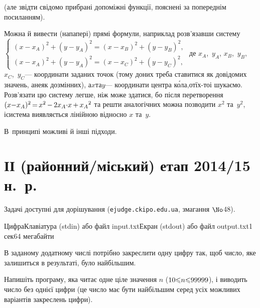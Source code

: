 \documentclass[14pt,a4paper]{extarticle}
\def\dib#1{\,#1\discretionary{}{\mbox{$#1$}}{}\,}
\begin{document}
 (але звідти свідомо прибрані допоміжні функції, пояснені за попереднім посиланням).

Можна й вивести (на\nolinebreak[3] папері) прямі формули, наприклад розв'язавши систему
$\left\{
\begin{array}{c}
(x{-}x_A)^2+(y{-}y_A)^2 = (x{-}x_B)^2+(y{-}y_B)^2,\\
(x{-}x_A)^2+(y{-}y_A)^2 = (x{-}x_C)^2+(y{-}y_C)^2,
\end{array}
\right.$
де $x_A$,~$y_A$, $x_B$,~$y_B$, $x_C$,~$y_C$\nolinebreak[3] --- координати заданих точок (тому до\nolinebreak[3] них треба ставитися як до\nolinebreak[3] відомих значень, а\nolinebreak[3] не\nolinebreak[3] як до\nolinebreak[3] змінних), а\nolinebreak[3] $x$\nolinebreak[1] та\nolinebreak[3] $y$\nolinebreak[3] --- координати центра к\'{о}ла,\linebreak[1] от\nolinebreak[1] їх-то\nolinebreak[1] і шукаємо. Розв'язати цю систему легше, ніж може здатися, бо після перетворення ${(x{-}x_A)^2}\dib{{=}}x^2\dib{{-}}2x_A{\cdot}x\dib{{+}}{x_A}^2$ та решти аналогічних можна позводити $x^2$ та~$y^2$, і\nolinebreak[3] система виявляється лінійною відносно $x$ та~$y$.

В~принципі можливі й інші підходи.






\section{ІІ (районний/міський) етап 2014/15 н.~р.}

Задачі доступні для дорішування (\verb"ejudge.ckipo.edu.ua", змагання $\No$48).

\renewenvironment{problemAllDefault}[1]{\vspace{10mm}\par\begin{problem}{#1}{Клавіатура (stdin) або файл input.txt}{Екран (stdout) або файл output.txt}{1 сек}{64 мегабайти}}{\end{problem}}

\begin{problemAllDefault}{Цифра}

В заданому додатному числі потрібно закреслити одну цифру так, щоб число, яке залишиться в результаті, було найбільшим.

Напишіть програму, яка читає одне ціле значення $n$ ($10{\leqslant}n{\leqslant}99999$), і виводить число без однієї цифри (це число має бути найбільшим серед усіх можливих варіантів закреслень цифри).

\Examples
\begin{exampleSimple}{3em}{3em}%
%
%
\end{exampleSimple}

\end{problemAllDefault}
	
\end{document}
